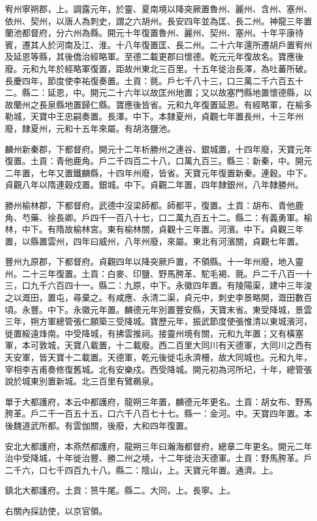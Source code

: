 \begin{pinyinscope}
 宥州寧朔郡，上。調露元年，於靈、夏南境以降突厥置魯州、麗州、含州、塞州、依州、契州，以唐人為刺史，謂之六胡州。長安四年並為匡、長二州。神龍三年置蘭池都督府，分六州為縣。開元十年復置魯州、麗州、契州、塞州。十年平康待賓，遷其人於河南及江、淮。十八年復置匡、長二州。二十六年還所遷胡戶置宥州及延恩等縣，其後僑治經略軍。至德二載更郡曰懷德。乾元元年復故名。寶應後廢。元和九年於經略軍復置，距故州東北三百里。十五年徙治長澤，為吐蕃所破。長慶四年，節度使李祐復奏置。土貢：氈。戶七千八十三，口三萬二千六百五十二。縣二：延恩，中。開元二十六年以故匡州地置；又以故塞門縣地置懷德縣，以故蘭州之長泉縣地置歸仁縣。寶應後皆省。元和九年復置延恩。有經略軍，在榆多勒城，天寶中王忠嗣奏置。長澤。中下。本隸夏州，貞觀七年置長州，十三年州廢，隸夏州，元和十五年來屬。有胡洛鹽池。



 麟州新秦郡，下都督府。開元十二年析勝州之連谷、銀城置，十四年廢，天寶元年復置。土貢：青他鹿角。戶二千四百二十八，口萬九百三。縣三：新秦，中。開元二年置，七年又置鐵麟縣，十四年州廢，皆省。天寶元年復置新秦。連穀。中下。貞觀八年以隋連穀戍置。銀城。中下。貞觀二年置，四年隸銀州，八年隸勝州。



 勝州榆林郡，下都督府。武德中沒梁師都。師都平，復置。土貢：胡布、青他鹿角、芍藥、徐長卿。戶四千一百八十七，口二萬九百五十二。縣二：有義勇軍。榆林，中下。有隋故榆林宮。東有榆林關，貞觀十三年置。河濱。中下。貞觀三年置，以縣置雲州，四年曰威州，八年州廢，來屬。東北有河濱關，貞觀七年置。



 豐州九原郡，下都督府。貞觀四年以降突厥戶置，不領縣。十一年州廢，地入靈州。二十三年復置。土貢：白麥、印鹽、野馬胯革、駝毛褐、氈。戶二千八百一十三，口九千六百四十一。縣二：九原，中下。永徽四年置。有陵陽渠，建中三年浚之以溉田，置屯，尋棄之。有咸應、永清二渠，貞元中，刺史李景略開，溉田數百頃。永豐。中下。永徽元年置。麟德元年別置豐安縣，天寶末省。東受降城，景雲三年，朔方軍總管張仁願築三受降城。寶歷元年，振武節度使張惟清以東城濱河，徙置綏遠烽南。中受降城，有拂雲推祠。接靈州境有關，元和九年置；又有橫塞軍，本可敦城，天寶八載置，十二載廢。西二百里大同川有天德軍，大同川之西有天安軍，皆天寶十二載置。天德軍，乾元後徙屯永濟柵，故大同城也。元和九年，宰相李吉甫奏修復舊城。北有安樂戍。西受降城。開元初為河所圮，十年，總管張說於城東別置新城。北三百里有鷿鵜泉。



 單于大都護府，本云中都護府，龍朔三年置，麟德元年更名。土貢：胡女布、野馬胯革。戶二千一百五十五，口六千八百七十七。縣一：金河。中。天寶四年置。本後魏道武所都。有雲伽關，後廢，大和四年復置。



 安北大都護府，本燕然都護府，龍朔三年曰瀚海都督府，總章二年更名。開元二年治中受降城，十年徙治豐、勝二州之境，十二年徙治天德軍。土貢：野馬胯革。戶二千六，口七千四百九十八。縣二：陰山，上。天寶元年置。通濟。上。



 鎮北大都護府。土貢：筼牛尾。縣二。大同，上。長寧。上。



 右關內採訪使，以京官領。



\end{pinyinscope}